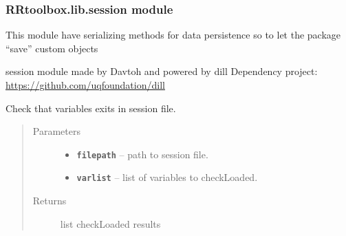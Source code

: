 \documentclass[letterpaper,10pt,english]{sphinxmanual}
\begin{document}
\subsubsection{RRtoolbox.lib.session module}
\label{RRtoolbox.lib:module-RRtoolbox.lib.session}\label{RRtoolbox.lib:rrtoolbox-lib-session-module}
This module have serializing methods for data persistence so to let the package ``save'' custom objects

session module made by Davtoh and powered by dill
Dependency project: \href{https://github.com/uqfoundation/dill}{https://github.com/uqfoundation/dill}

\begin{fulllineitems}
\label{RRtoolbox.lib:RRtoolbox.lib.session.checkFromSession}
Check that variables exits in session file.
\begin{quote}\begin{description}
\item[{Parameters}] \leavevmode\begin{itemize}
\item {} 
\textbf{\texttt{filepath}} -- path to session file.

\item {} 
\textbf{\texttt{varlist}} -- list of variables to checkLoaded.

\end{itemize}

\item[{Returns}] \leavevmode
list checkLoaded results

\end{description}\end{quote}

\end{fulllineitems}

\end{document}
